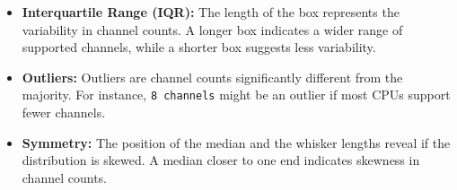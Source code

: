 \documentclass{article}
\begin{document}
\begin{itemize}
\begin{itemize}
\begin{itemize}
				\item \textbf{Interquartile Range (IQR):} The length of the box represents the variability in channel counts. A longer box indicates a wider range of supported channels, while a shorter box suggests less variability.
				\item \textbf{Outliers:} Outliers are channel counts significantly different from the majority. For instance, \texttt{8 channels} might be an outlier if most CPUs support fewer channels.
				\item \textbf{Symmetry:} The position of the median and the whisker lengths reveal if the distribution is skewed. A median closer to one end indicates skewness in channel counts.
			\end{itemize}
		\end{itemize}
	\end{itemize}
\end{document}
